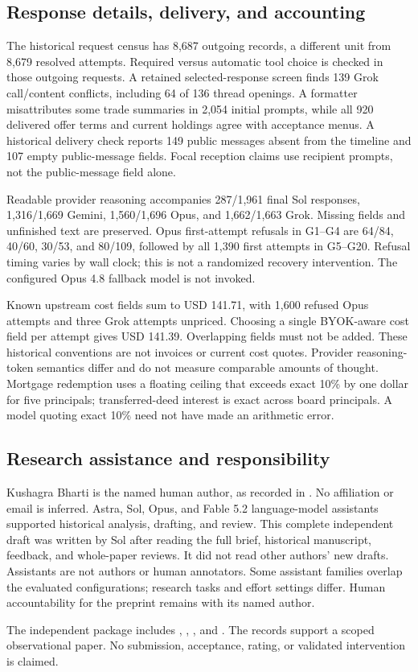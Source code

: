 \subsection{Response details, delivery, and accounting}
The historical request census has 8,687 outgoing records, a different unit from 8,679 resolved attempts. Required versus automatic tool choice is checked in those outgoing requests. A retained selected-response screen finds 139 Grok call/content conflicts, including 64 of 136 thread openings. A formatter misattributes some trade summaries in 2,054 initial prompts, while all 920 delivered offer terms and current holdings agree with acceptance menus. A historical delivery check reports 149 public messages absent from the timeline and 107 empty public-message fields. Focal reception claims use recipient prompts, not the public-message field alone.

Readable provider reasoning accompanies 287/1,961 final Sol responses, 1,316/1,669 Gemini, 1,560/1,696 Opus, and 1,662/1,663 Grok. Missing fields and unfinished text are preserved. Opus first-attempt refusals in G1--G4 are 64/84, 40/60, 30/53, and 80/109, followed by all 1,390 first attempts in G5--G20. Refusal timing varies by wall clock; this is not a randomized recovery intervention. The configured Opus 4.8 fallback model is not invoked.

Known upstream cost fields sum to USD 141.71, with 1,600 refused Opus attempts and three Grok attempts unpriced. Choosing a single BYOK-aware cost field per attempt gives USD 141.39. Overlapping fields must not be added. These historical conventions are not invoices or current cost quotes. Provider reasoning-token semantics differ and do not measure comparable amounts of thought. Mortgage redemption uses a floating ceiling that exceeds exact 10\% by one dollar for five principals; transferred-deed interest is exact across board principals. A model quoting exact 10\% need not have made an arithmetic error.

\subsection{Research assistance and responsibility}
Kushagra Bharti is the named human author, as recorded in . No affiliation or email is inferred. Astra, Sol, Opus, and Fable 5.2 language-model assistants supported historical analysis, drafting, and review. This complete independent draft was written by Sol after reading the full brief, historical manuscript, feedback, and whole-paper reviews. It did not read other authors' new drafts. Assistants are not authors or human annotators. Some assistant families overlap the evaluated configurations; research tasks and effort settings differ. Human accountability for the preprint remains with its named author.

The independent package includes , , , and . The records support a scoped observational paper. No submission, acceptance, rating, or validated intervention is claimed.
